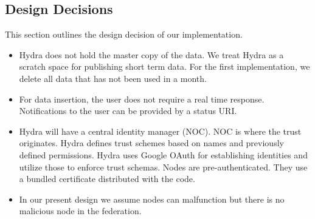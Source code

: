 

\subsection{Design Decisions}
This section outlines the design decision of our implementation.

\begin{itemize}
    
    \item Hydra does not hold the master copy of the data. We treat Hydra as a scratch space for publishing short term data. For the first implementation, we delete all data that has not been used in a month.
    
    \item For data insertion, the user does not require a real time response. Notifications to the user can be provided by a status URI.
    
    

    \item Hydra will have a central identity manager (NOC). NOC is where the trust originates. Hydra defines trust schemes based on names and previously defined permissions. Hydra uses Google OAuth for establishing identities and utilize those to enforce trust schemas. Nodes are pre-authenticated. They use a bundled certificate distributed with the code.
    
     \item In our present design we assume nodes can malfunction but there is no malicious node in the federation.
   
\end{itemize}



    

